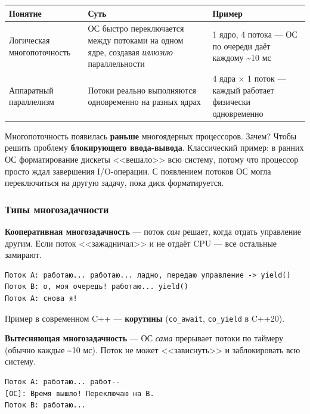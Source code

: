 \documentclass[a4paper,12pt]{article}
\begin{document}
\begin{center}
\begin{tabular}{lp{5cm}p{5cm}}
\toprule
\textbf{Понятие} & \textbf{Суть} & \textbf{Пример} \\
\midrule
Логическая многопоточность
    & ОС быстро переключается между потоками на одном ядре, создавая \textit{иллюзию} параллельности
    & 1 ядро, 4 потока --- ОС по очереди даёт каждому \textasciitilde10 мс \\
\addlinespace
Аппаратный параллелизм
    & Потоки реально выполняются одновременно на разных ядрах
    & 4 ядра $\times$ 1 поток --- каждый работает физически одновременно \\
\bottomrule
\end{tabular}
\end{center}

\medskip
Многопоточность появилась \textbf{раньше} многоядерных процессоров. Зачем?
Чтобы решить проблему \textbf{блокирующего ввода-вывода}. Классический пример:
в ранних ОС форматирование дискеты <<вешало>> всю систему, потому что процессор
просто ждал завершения I/O-операции. С появлением потоков ОС могла переключиться
на другую задачу, пока диск форматируется.

\subsubsection{Типы многозадачности}

\textbf{Кооперативная многозадачность} --- поток \textit{сам} решает, когда
отдать управление другим. Если поток <<зажадничал>> и не отдаёт CPU ---
все остальные замирают.

\begin{lstlisting}[numbers=none]
Поток A: работаю... работаю... ладно, передаю управление -> yield()
Поток B: о, моя очередь! работаю... yield()
Поток A: снова я!
\end{lstlisting}

Пример в современном C++ --- \textbf{корутины} (\texttt{co\_await},
\texttt{co\_yield} в C++20).

\medskip
\textbf{Вытесняющая многозадачность} --- ОС \textit{сама} прерывает потоки
по таймеру (обычно каждые \textasciitilde10 мс). Поток не может <<зависнуть>>
и заблокировать всю систему.

\begin{lstlisting}[numbers=none]
Поток A: работаю... работ--
[ОС]: Время вышло! Переключаю на B.
Поток B: работаю...
\end{lstlisting}
\end{document}
